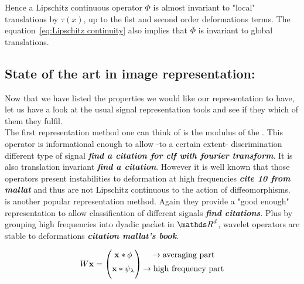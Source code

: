 \documentclass[a4paper,11pt]{report}
\begin{document}
      Hence a Lipschitz continuous operator $\Phi$ is almost invariant to "local" translations by $\tau(x)$, up to the fist and second order deformations terms. The equation~\ref{eq:Lipschitz continuity} also implies that $\Phi$ is invariant to global translations.\\

    \subsection{State of the art in image representation:}
      \label{seq:Intro/Image rep/State of the art}      
      
			Now that we have listed the properties we would like our representation to have, let us have a look at the usual signal representation tools and see if they which of them they fulfil.\\
      
			The first representation method one can think of is the modulus of the . This operator is informational enough to allow -to a certain extent- discrimination different type of signal \textbf{\textit{find a citation for clf with fourier transform}}. It is also translation invariant \textbf{\textit{find a citation}}. However it is well known that those operators present instabilities to deformation at high frequencies \textbf{\textit{cite 10 from mallat}} and thus are not Lipschitz continuous to the action of diffeomorphisms.\\
      
			 is another popular representation method. Again they provide a "good enough" representation to allow classification of different signals \textbf{\textit{find citations}}. Plus by grouping high frequencies into dyadic packet in $\dsR^{d}$, wavelet operators are stable to deformations \textbf{\textit{citation mallat's book}}. 
			
			
			\begin{equation}
				\begin{matrix}
					W{\bf x} =
					\begin{pmatrix}
						{\bf x} \ast \phi \\[0.5em]
						{\bf x} \ast \psi_{\lambda} \\[0.5em]
					\end{pmatrix}
					\begin{aligned}
						\begin{matrix}
							\rightarrow \text{averaging part}				\\[0.5em]
							\rightarrow \text{high frequency part}	\\[0.5em]
						\end{matrix}
					\end{aligned}
				\end{matrix}
			\end{equation}
		
\end{document}
